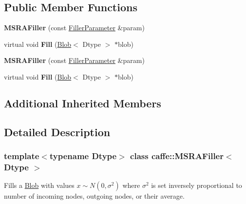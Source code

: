 \subsection*{Public Member Functions}
\begin{DoxyCompactItemize}
\item 
\mbox{\label{classcaffe_1_1_m_s_r_a_filler_a68b0367c462b9cfce5379074105282c9}} 
{\bfseries M\+S\+R\+A\+Filler} (const \mbox{\hyperlink{classcaffe_1_1_filler_parameter}{Filler\+Parameter}} \&param)
\item 
\mbox{\label{classcaffe_1_1_m_s_r_a_filler_a174e9fab9be5c0c598680bebc621ab8f}} 
virtual void {\bfseries Fill} (\mbox{\hyperlink{classcaffe_1_1_blob}{Blob}}$<$ Dtype $>$ $\ast$blob)
\item 
\mbox{\label{classcaffe_1_1_m_s_r_a_filler_a68b0367c462b9cfce5379074105282c9}} 
{\bfseries M\+S\+R\+A\+Filler} (const \mbox{\hyperlink{classcaffe_1_1_filler_parameter}{Filler\+Parameter}} \&param)
\item 
\mbox{\label{classcaffe_1_1_m_s_r_a_filler_a174e9fab9be5c0c598680bebc621ab8f}} 
virtual void {\bfseries Fill} (\mbox{\hyperlink{classcaffe_1_1_blob}{Blob}}$<$ Dtype $>$ $\ast$blob)
\end{DoxyCompactItemize}
\subsection*{Additional Inherited Members}


\subsection{Detailed Description}
\subsubsection*{template$<$typename Dtype$>$\newline
class caffe\+::\+M\+S\+R\+A\+Filler$<$ Dtype $>$}

Fills a \mbox{\hyperlink{classcaffe_1_1_blob}{Blob}} with values $ x \sim N(0, \sigma^2) $ where $ \sigma^2 $ is set inversely proportional to number of incoming nodes, outgoing nodes, or their average. 

